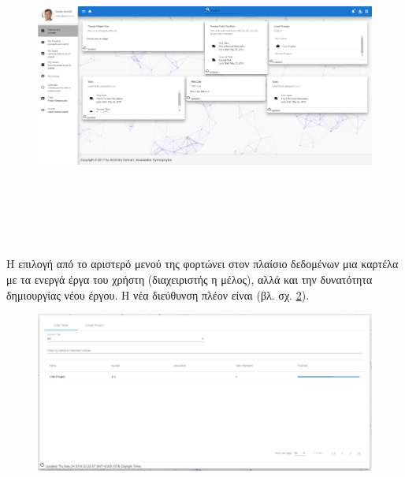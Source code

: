 \begin{figure}[!htb]
\includegraphics[width=\columnwidth, height=10cm]{images/userDashboard.png}
\caption{}
\label{fig:userDashboard}
\end{figure}

\subsubsection*{}
\pSpace Η επιλογή  από το αριστερό μενού της  φορτώνει στον πλαίσιο δεδομένων μια καρτέλα με τα ενεργά έργα του χρήστη (διαχειριστής η μέλος), αλλά και την δυνατότητα δημιουργίας νέου έργου. Η νέα διεύθυνση πλέον είναι  (βλ. σχ. \ref{fig:userMyProjects}).

\begin{figure}[!htb]
\includegraphics[width=\columnwidth, scale=4]{images/userMyProjects.png}
\caption{}
\label{fig:userMyProjects}
\end{figure}

